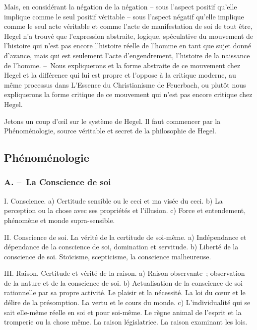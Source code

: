 \documentclass[french,twoside]{book} %
\begin{document}
Mais, en considérant la négation de la négation – sous l’aspect positif qu’elle implique comme le seul positif véritable – sous l’aspect négatif qu’elle implique comme le seul acte véritable et comme l’acte de manifestation de soi de tout être, Hegel n’a trouvé que l’expression abstraite, logique, spéculative du mouvement de l’histoire qui n’est pas encore l’histoire réelle de l’homme en tant que sujet donné d’avance, mais qui est seulement l’acte d’engendrement, l’histoire de la naissance de l’homme. – Nous expliquerons et la forme abstraite de ce mouvement chez Hegel et la différence qui lui est propre et l’oppose à la critique moderne, au même processus dans L’Essence du Christianisme de Feuerbach, ou plutôt nous expliquerons la forme critique de ce mouvement qui n’est pas encore critique chez Hegel.\par
Jetons un coup d’œil sur le système de Hegel. Il faut commencer par la Phénoménologie, source véritable et secret de la philosophie de Hegel.
\subsection[{Phénoménologie}]{Phénoménologie\protect\footnotemark }
\subsubsection[{A. – La Conscience de soi}]{A. – La Conscience de soi}
\noindent I. Conscience. a) Certitude sensible ou le ceci et ma visée du ceci. b) La perception ou la chose avec ses propriétés et l’illusion. c) Force et entendement, phénomène et monde supra-sensible.\par
II. Conscience de soi. La vérité de la certitude de soi-même. a) Indépendance et dépendance de la conscience de soi, domination et servitude. b) Liberté de la conscience de soi. Stoïcisme, scepticisme, la conscience malheureuse.\par
III. Raison. Certitude et vérité de la raison. a) Raison observante ; observation de la nature et de la conscience de soi. b) Actualisation de la conscience de soi rationnelle par sa propre activité. Le plaisir et la nécessité. La loi du cœur et le délire de la présomption. La vertu et le cours du monde. c) L’individualité qui se sait elle-même réelle en soi et pour soi-même. Le règne animal de l’esprit et la tromperie ou la chose même. La raison législatrice. La raison examinant les lois.
\end{document}
